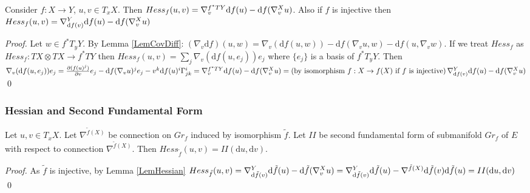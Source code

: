 \documentclass{llncs}
\newcommand{\partderiv}[2]{\frac{\partial #1}{\partial #2}}
\newcommand{\CovariantDiffManif}[1]{\nabla^{#1}}
\newcommand{\CovariantDerivManif}[2]{\tensor*{\nabla}{^{#1}_{#2}}}
\newcommand{\CovariantDeriv}[1]{\nabla_{#1}}
\newcommand{\Diff}{\mathrm{d}}
\newcommand{\TangentSpaceArg}[2]{{T_{#2}}{#1}}
\newcommand{\TangentBundle}[1]{T{#1}}
\newcommand {\Preimage}[2]{{#2}^*{#1}}
\newcommand \TArgPreimage[3]{\Preimage{\TangentSpaceArg{#1}{#2}}{#3}}
\newcommand \TPreimage[2]{\Preimage{\TangentBundle{#1}}{#2}}
\begin{document}
\begin{lemma} \label{LemHessian}
Consider $f:X\to Y$, $u, v\in T_x X$. Then
$Hess_f(u,v)=\CovariantDerivManif{\TPreimage{Y}{f}} {v} \Diff f(u) - 
							\Diff f( 
							\CovariantDerivManif{X}{v}u
							)$. Also if $f$ is injective then
$Hess_f(u,v)=\CovariantDerivManif{Y}{ \Diff f(v)} \Diff f(u) - 
							\Diff f( 
							\CovariantDerivManif{X}{v}u
							)$
\end{lemma}

\begin{proof}
Let $w\in \TArgPreimage{Y}{y}{f}$. By Lemma \ref{LemCovDiff}: 
$(\CovariantDeriv{v} \Diff f)(u, w) = \CovariantDeriv{v}{(\Diff f(u, w))} - \Diff f(\CovariantDeriv{v}{u}, w) - \Diff f({u}, \CovariantDeriv{v}{w})$.
If we treat $Hess_f$ as $Hess_f:\TangentBundle{X}\otimes\TangentBundle{X}\to \TPreimage{Y}{f}$ 
then $Hess_f(u, v)= \sum_{j} \CovariantDeriv{v}{(\Diff f(u, e_j))} e_j$ where $\{e_j\}$ is a basis of $\TArgPreimage{Y}{y}{f}$. Then
$\CovariantDeriv{v}{(\Diff f(u, e_j))} e_j = \partderiv{(f(u)^j)}{v} e_j - \Diff f(\CovariantDeriv{v}{u})^j e_j - v^k \Diff f(u)^i \tensor*{\Gamma}{^i_j_k}= 
\CovariantDerivManif{\TPreimage{Y}{f}} {v} \Diff f(u) - 
							\Diff f( 
							\CovariantDerivManif{X}{v}u
							) = 
							\textrm{(by isomorphism }f:X\to f(X) \textrm{ if } f \textrm{ is injective)}\,
							\CovariantDerivManif{Y} {\Diff f(v)} \Diff f(u) - 
							\Diff f( 
							\CovariantDerivManif{X}{v}u )$
\qed 
\end{proof}

\subsubsection{Hessian and Second Fundamental Form}

\begin{lemma}  \label{LemSecondFormHessian}
Let $u, v \in T_xX$. Let $\CovariantDiffManif{\tilde{f}(X)}$ be connection on $Gr_f$ induced by isomorphism $\tilde{f}$. Let $II$ be second fundamental form of submanifold $Gr_f$ of $E$ with respect to connection $\CovariantDiffManif{\tilde{f}(X)}$. Then $Hess_{\tilde{f}}(u, v) = II(\Diff u, \Diff v)$.
\end{lemma}

\begin{proof}
As $\tilde{f}$ is injective, by Lemma \ref{LemHessian} $Hess_{\tilde{f}}(u, v) = 
						\CovariantDerivManif{Y} {\Diff \tilde{f}(v)} \Diff \tilde{f}(u) - 
							\Diff \tilde{f}(\CovariantDerivManif{X}{v}u ) = \CovariantDerivManif{Y} {\Diff \tilde{f}(v)} \Diff \tilde{f}(u) - 
							\CovariantDiffManif{\tilde{f}(X)}{\Diff \tilde{f}(v)}\Diff \tilde{f}(u) = II(\Diff u, \Diff v)$
\qed
\end{proof}
\end{document}
